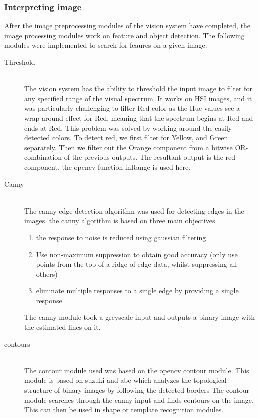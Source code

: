 \subsubsection{Interpreting image} 
After the image preprocessing modules of the vision system have completed, the image processing modules work on feature and object detection. The following modules were implemented to search for feaures on a given image. 
\begin{description}
\item[Threshold]\hfill \\
The vision system has the ability to threshold the input image to filter for any specified range of the visual spectrum. 
It works on HSI images, and it was particularly challenging to filter Red color as the Hue values see a wrap-around effect for Red, meaning that the spectrum begins at Red and ends at Red.
This problem was solved by working around the easily detected colors.
To detect red, we first filter for Yellow, and Green separately. Then we filter out the Orange component from a bitwise OR-combination of the previous outputs. The resultant output is the red component.
the opencv function inRange is used here.

\item[Canny]\hfill \\
The canny edge detection algorithm \cite{article:canny}  was used for detecting edges in the images. the canny algorithm is based on three main objectives
\begin{enumerate}
  \item the response to noise is reduced using gaussian filtering
  \item Use non-maximum suppression to obtain good accuracy (only use points from the top of a ridge of edge data, whilst suppressing all others)
  \item eliminate multiple responses to a single edge by providing a single response
\end{enumerate}

The canny module took a greyscale input and outputs a binary image with the estimated lines on it.

\item[contours]\hfill \\
The contour module used was based on the opencv contour module. This module is based on suzuki and abe which analyzes the topological structure of binary
images by following the detected borders \cite{article:suzuki} 
The contour module searches through the canny input and finds contours on the image. This can then be used in shape or template recognition modules.


\end{description}
